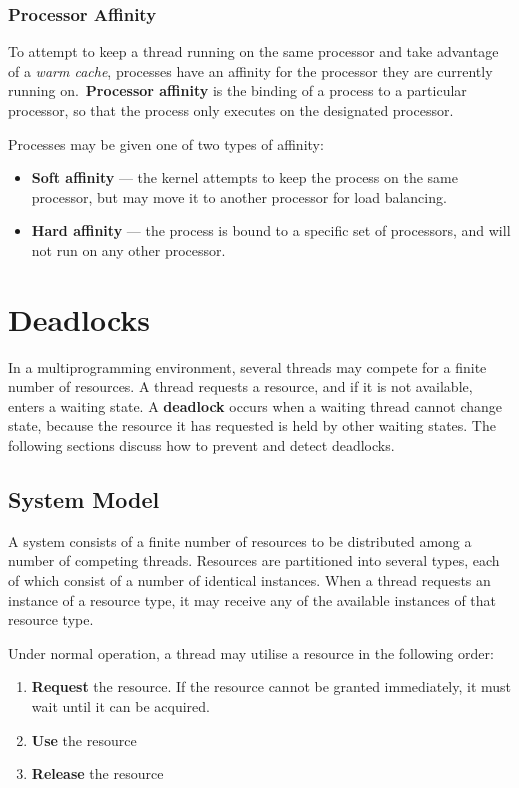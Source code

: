 \documentclass{article}
\begin{document}
\subsubsection{Processor Affinity}
To attempt to keep a thread running on the same processor and take
advantage of a \textit{warm cache}, processes have an affinity for the
processor they are currently running on.\ \textbf{Processor affinity}
is the binding of a process to a particular processor, so that the
process only executes on the designated processor.

Processes may be given one of two types of affinity:
\begin{itemize}
    \item \textbf{Soft affinity} --- the kernel attempts to keep the
          process on the same processor, but may move it to another
          processor for load balancing.
    \item \textbf{Hard affinity} --- the process is bound to a specific
          set of processors, and will not run on any other processor.
\end{itemize}
\section{Deadlocks}
In a multiprogramming environment, several threads may compete for a
finite number of resources. A thread requests a resource, and if it is
not available, enters a waiting state. A \textbf{deadlock} occurs when
a waiting thread cannot change state, because the resource it has
requested is held by other waiting states. The following sections
discuss how to prevent and detect deadlocks.
\subsection{System Model}
A system consists of a finite number of resources to be distributed
among a number of competing threads. Resources are partitioned into
several types, each of which consist of a number of identical
instances. When a thread requests an instance of a resource type, it
may receive any of the available instances of that resource type.

Under normal operation, a thread may utilise a resource in the
following order:
\begin{enumerate}
    \item \textbf{Request} the resource. If the resource cannot be
          granted immediately, it must wait until it can be acquired.
    \item \textbf{Use} the resource
    \item \textbf{Release} the resource
\end{enumerate}
\end{document}
